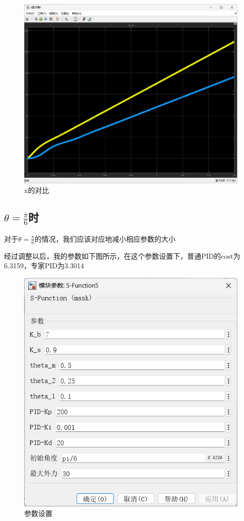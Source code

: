 \documentclass[12pt,a4paper,UTF8]{article}
\begin{document}
\begin{figure}[!htbp]
    \begin{minipage}[b]{0.45\linewidth}
        \centering
        \includegraphics[width=0.8\linewidth]{figures/x_2.png}
        \caption{x的对比}
    \end{minipage}
\end{figure}


\subsection{$\theta = \frac{\pi}{6}$时}

对于$\theta= \frac{\pi}{6}$的情况，我们应该对应地减小相应参数的大小

经过调整以后，我的参数如下图所示，在这个参数设置下，普通PID的cost为6.3159，专家PID为3.3014

\begin{figure}[htbp]
    \centering
    \includegraphics[width=0.3\linewidth]{figures/para_3.png}
    \caption{参数设置}
\end{figure}
\end{document}
